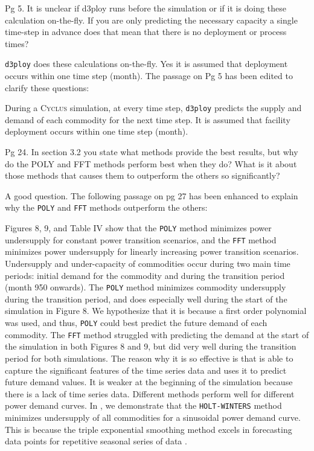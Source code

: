 \documentclass[answers,11pt]{exam}
\newcommand{\Cyclus}{\textsc{Cyclus}\xspace}%
\newcommand{\deploy}{\texttt{d3ploy}\xspace}%
\begin{document}
\begin{questions}
\question
Pg 5. It is unclear if d3ploy runs before the simulation or if it is 
doing these calculation on-the-fly. If you are only predicting the 
necessary capacity a single time-step in advance does that mean that 
there is no deployment or process times?

\begin{solution}
\deploy does these calculations on-the-fly. Yes it is assumed that deployment occurs 
within one time step (month). The passage on Pg 5 has been edited to clarify these 
questions: 

During a \Cyclus simulation, at every time step, \deploy 
predicts the supply and demand of each commodity for the next time 
step. 
It is assumed that facility deployment occurs 
within one time step (month). 
\end{solution}

\question
Pg 24. In section 3.2 you state what methods provide the best results, but why do the 
POLY and FFT methods perform best when they do? What is it about those methods that 
causes them to outperform the others so significantly?

\begin{solution}
A good question. The following passage on pg 27 has been enhanced to explain 
why the \texttt{POLY} and \texttt{FFT} methods outperform the others: 

Figures 8, 9, and Table 
IV show that the \texttt{POLY} method 
minimizes power undersupply for constant power transition scenarios, 
and the \texttt{FFT} method minimizes power undersupply for linearly increasing 
power transition scenarios. 
Undersupply and under-capacity of commodities occur during two main time periods: 
initial demand for the commodity and during the transition period (month 950 onwards).
The \texttt{POLY} method minimizes commodity undersupply during the transition period, 
and does especially well during the start of the simulation in Figure 8.  
We hypothesize that it is because a first order polynomial was used, and thus, \texttt{POLY}
could best predict the future demand of each commodity. 
The \texttt{FFT} method struggled with predicting the demand at the start of the simulation
in both Figures 8 and 9, 
but did very well during the transition period for both simulations. 
The reason why it is so effective is that is able to capture the significant features 
of the time series data and uses it to predict future demand values. 
It is weaker at the beginning of the simulation because there is a lack of time series data. 
Different methods perform well for different power demand curves. In 
\cite{chee_demonstration_2019}, we demonstrate that the \texttt{HOLT-WINTERS} method 
minimizes undersupply of all commodities for a sinusoidal power demand curve. 
This is because the triple exponential smoothing
method excels in forecasting data points for repetitive seasonal
series of data \cite{chee_demonstration_2019}.
\end{solution}


\end{questions}
\end{document}
